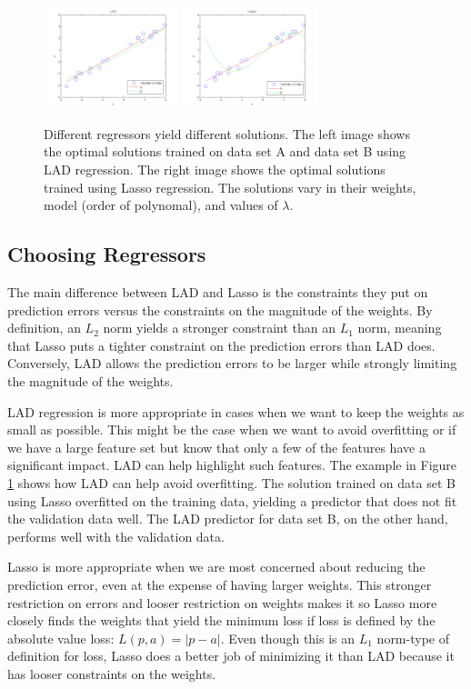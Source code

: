 \documentclass[11pt]{article}   %
\theoremstyle{plain}
\begin{document}
\begin{figure}[h!]\label{lad-lasso}
  \caption{Different regressors yield different solutions. The left image shows the optimal solutions trained on data set A and data set B using LAD regression. The right image shows the optimal solutions trained using Lasso regression. The solutions vary in their weights, model (order of polynomal), and values of $\lambda$. }
  \centering
    \includegraphics[width=0.35\textwidth]{figures/4_1_lad_fit_results.png}
    \includegraphics[width=0.35\textwidth]{figures/4_2_lasso_fit_results.png}
\end{figure}

\subsection{Choosing Regressors}

The main difference between LAD and Lasso is the constraints they put on prediction errors versus the constraints on the magnitude of the weights. By definition, an $L_2$ norm yields a stronger constraint than an $L_1$ norm, meaning that Lasso puts a tighter constraint on the prediction errors than LAD does. Conversely, LAD allows the prediction errors to be larger while strongly limiting the magnitude of the weights. 

LAD regression is more appropriate in cases when we want to keep the weights as small as possible. This might be the case when we want to avoid overfitting or if we have a large feature set but know that only a few of the features have a significant impact. LAD can help highlight such features. The example in Figure \ref{lad-lasso} shows how LAD can help avoid overfitting. The solution trained on data set B using Lasso overfitted on the training data, yielding a predictor that does not fit the validation data well. The LAD predictor for data set B, on the other hand, performs well with the validation data.

Lasso is more appropriate when we are most concerned about reducing the prediction error, even at the expense of having larger weights. This stronger restriction on errors and looser restriction on weights makes it so Lasso more closely finds the weights that yield the minimum loss if loss is defined by the absolute value loss: $L(p,a) = |p - a|$. Even though this is an $L_1$ norm-type of definition for loss, Lasso does a better job of minimizing it than LAD because it has looser constraints on the weights.
\end{document}
